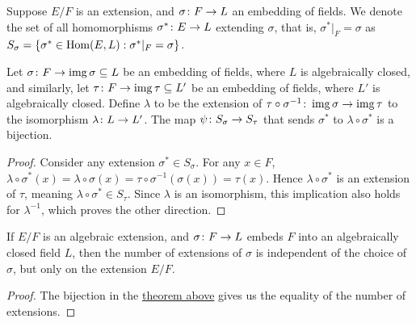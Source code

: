 \begin{definition}
    Suppose \(E/F\) is an extension,
    and \(\sigma\colon F\to L\) an embedding of fields.
    We denote the set of all homomorphisms \(\sigma^\ast\colon E\to L\)
    extending \(\sigma\), that is, \(\sigma^\ast\vert_F = \sigma\) as
    \(S_\sigma = \{\sigma^\ast\in\operatorname{Hom}(E,L) : \sigma^\ast\vert_F = \sigma\}\).
\end{definition}
\begin{theorem}\label{thm:homomorphism-set-bijection}
    Let \(\sigma\colon F\to\operatorname{img}\sigma \subseteq L\) be an embedding of fields,
    where \(L\) is algebraically closed,
    and similarly, let \(\tau\colon F\to\operatorname{img}\tau \subseteq L'\) be an embedding of fields,
    where \(L'\) is algebraically closed.
    Define \(\lambda\) to be the extension of \(\tau\circ\sigma^{-1}\colon\operatorname{img}\sigma\to\operatorname{img}\tau\)
    to the isomorphism \(\lambda\colon L\to L'\).
    The map \(\psi\colon S_\sigma\to S_\tau\)
    that sends \(\sigma^\ast\) to \(\lambda\circ\sigma^\ast\) is a bijection.
\end{theorem}
\begin{proof}
    Consider any extension \(\sigma^\ast \in S_\sigma\).
    For any \(x \in F\),
    \(\lambda\circ\sigma^\ast(x) = \lambda\circ\sigma(x) = \tau\circ\sigma^{-1}(\sigma(x)) = \tau(x)\).
    Hence \(\lambda\circ\sigma^\ast\) is an extension of \(\tau\),
    meaning \(\lambda\circ\sigma^\ast \in S_\tau\).
    Since \(\lambda\) is an isomorphism, this implication also holds for \(\lambda^{-1}\),
    which proves the other direction.
\end{proof}
\begin{corollary}
    If \(E/F\) is an algebraic extension,
    and \(\sigma\colon F\to L\) embeds \(F\) into an algebraically closed field \(L\),
    then the number of extensions of \(\sigma\) is independent of the choice of \(\sigma\),
    but only on the extension \(E/F\).
\end{corollary}
\begin{proof}
    The bijection in the \hyperref[thm:homomorphism-set-bijection]{theorem above}
    gives us the equality of the number of extensions.
\end{proof}

